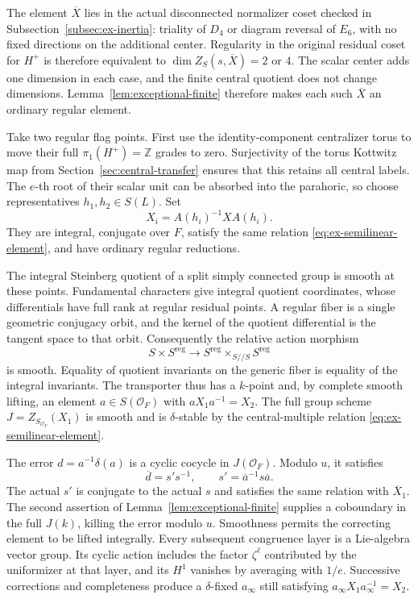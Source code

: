 \documentclass[11pt,a4paper]{article}
\theoremstyle{definition}
\theoremstyle{remark}
\begin{document}
The element \(\overline X\) lies in the actual disconnected normalizer
coset checked in Subsection~\ref{subsec:ex-inertia}:
triality of \(D_4\) or diagram reversal of \(E_6\), with no fixed
directions on the additional center.
Regularity in the original residual coset for \(H^+\) is therefore
equivalent to
\(\dim Z_S(s,\overline X)=2\) or \(4\).
The scalar center adds one dimension in each case, and the finite central
quotient does not change dimensions.
Lemma~\ref{lem:exceptional-finite} therefore makes each such
\(\overline X\) an ordinary regular element.

Take two regular flag points.
First use the identity-component centralizer torus to move their full
\(\pi_1(H^+)=\mathbb Z\) grades to zero.
Surjectivity of the torus Kottwitz map from
Section~\ref{sec:central-transfer} ensures that this retains all central
labels.
The \(e\)-th root of their scalar unit can be absorbed into the parahoric,
so choose representatives \(h_1,h_2\in S(L)\).
Set
\[
X_i=A(h_i)^{-1}X A(h_i).
\]
They are integral, conjugate over \(F\), satisfy the same relation
\eqref{eq:ex-semilinear-element}, and have ordinary regular reductions.

The integral Steinberg quotient of a split simply connected group is
smooth at these points. Fundamental characters give integral quotient
coordinates, whose differentials have full rank at regular residual
points.
A regular fiber is a single geometric conjugacy orbit, and the kernel of
the quotient differential is the tangent space to that orbit.
Consequently the relative action morphism
\begin{equation}\label{eq:ex-integral-action-map}
S\times S^{\mathrm{reg}}\longrightarrow
S^{\mathrm{reg}}\times_{S//S}S^{\mathrm{reg}}
\end{equation}
is smooth.
Equality of quotient invariants on the generic fiber is equality of the
integral invariants.
The transporter thus has a \(k\)-point and, by complete smooth lifting,
an element \(a\in S(\mathcal O_F)\) with
\(aX_1a^{-1}=X_2\).
The full group scheme
\(J=Z_{S_{\mathcal O_F}}(X_1)\) is smooth and is \(\delta\)-stable by the
central-multiple relation \eqref{eq:ex-semilinear-element}.

The error \(d=a^{-1}\delta(a)\) is a cyclic cocycle in
\(J(\mathcal O_F)\).
Modulo \(u\), it satisfies
\begin{equation}\label{eq:ex-residual-descent-error}
\overline d=s's^{-1},\qquad
s'=\overline a^{-1}s\overline a.
\end{equation}
The actual \(s'\) is conjugate to the actual \(s\) and satisfies the same
relation with \(\overline X_1\).
The second assertion of Lemma~\ref{lem:exceptional-finite} supplies a
coboundary in the full \(J(k)\), killing the error modulo \(u\).
Smoothness permits the correcting element to be lifted integrally.
Every subsequent congruence layer is a Lie-algebra vector group.
Its cyclic action includes the factor \(\zeta^\ell\) contributed by the
uniformizer at that layer, and its \(H^1\) vanishes by averaging with
\(1/e\).
Successive corrections and completeness produce a \(\delta\)-fixed
\(a_\infty\) still satisfying
\(a_\infty X_1a_\infty^{-1}=X_2\).
\end{document}
